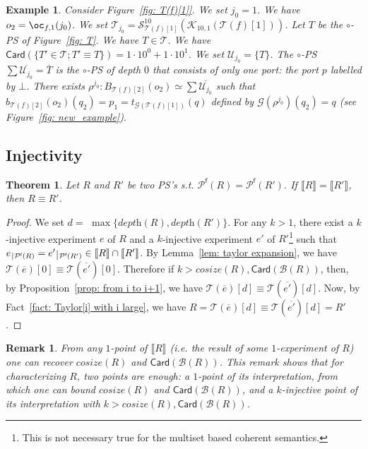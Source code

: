 \documentclass{article}
\newcommand{\target}[1]{t_{#1}}
\theoremstyle{plain}
\newtheorem{theorem}{Theorem}
\newtheorem{example}{Example}
\newtheorem{rem}{Remark}
\newcommand{\nontrivialconnected}[3]{\mathcal{S}_{#1}^{#3}(#2)}
\newcommand{\taylor}[2]{\mathcal{T}(#1)[#2]}
\newcommand{\criticalports}[3]{\mathcal{K}_{#2, #3}(#1)}
\newcommand{\groundof}[1]{\mathcal{G}(#1)}
\newcommand{\cosize}[1]{\textit{cosize}(#1)}
\newcommand{\depthof}[1]{\textit{depth}(#1)}
\def\restriction#1#2{\mathchoice
              {\setbox1\hbox{${\displaystyle #1}_{\scriptstyle #2}$}
              \restrictionaux{#1}{#2}}
              {\setbox1\hbox{${\textstyle #1}_{\scriptstyle #2}$}
              \restrictionaux{#1}{#2}}
              {\setbox1\hbox{${\scriptstyle #1}_{\scriptscriptstyle #2}$}
              \restrictionaux{#1}{#2}}
              {\setbox1\hbox{${\scriptscriptstyle #1}_{\scriptscriptstyle #2}$}
              \restrictionaux{#1}{#2}}}
\def\restrictionaux#1#2{{#1\,\smash{\vrule height .8\ht1 depth .85\dp1}}_{\,#2}}
\newcommand{\cod}{\oc}
\newcommand{\conclusions}[1]{\mathcal{P}^{\textsf{f}}(#1)}
\newcommand{\sm}[1]{\llbracket #1 \rrbracket}
\newcommand{\Card}[1]{\textsf{Card}\left( #1 \right)}
\newcommand{\boxes}[1]{\mathcal{B}(#1)}
\begin{document}
\begin{example}
Consider Figure~\ref{fig: T(f)[1]}. We set $j_0 = 1$. We have $o_2 = \cod_{f, 1}(j_0)$. We set $\mathcal{T}_{j_0} = \nontrivialconnected{\taylor{f}{1}}{\criticalports{\taylor{f}{1}}{10}{1}}{10}$. Let $T$ be the $\circ$-PS of Figure~\ref{fig: T}. We have $T \in \mathcal{T}$. We have $\Card{\{ T' \in \mathcal{T} ; T' \equiv T \}} = 1 \cdot 10^0 + 1 \cdot 10^1$. We set $\mathcal{U}_{j_0} = \{ T \}$. The $\circ$-PS $\sum \overline{\mathcal{U}_{j_0}} = \overline{T}$ is the $\circ$-PS of depth $0$ that consists of only one port: the port $p$ labelled by $\bot$. There exists $\rho^{j_0}: B_{\taylor{f}{2}}(o_2) \simeq \sum \overline{\mathcal{U}_{j_0}}$ such that $b_{\taylor{f}{2}}(o_2)(q_2) = p_1 = \target{\groundof{\taylor{f}{1}}}(q)$ defined by $\groundof{\rho^{j_0}}(q_2) = q$ (see Figure~\ref{fig: new_example}).
\end{example}

\subsection{Injectivity}

\begin{theorem}\label{thm: injectivity}
Let $R$ and $R'$ be two PS's s.t. $\conclusions{R} = \conclusions{R'}$. If $\sm{R} = \sm{R'}$, then $R \equiv R'$.
\end{theorem}

\begin{proof}
We set $d = $ $\max{\{ \depthof{R}, \depthof{R'} \}}$. 
For any $k > 1$, there exist a $k$-injective experiment $e$ of $R$ and a $k$-injective experiment $e'$ of $R'$\footnote{This is not necessary true for the multiset based coherent semantics.} such that $\restriction{e}{\conclusions{R}} = \restriction{e'}{\conclusions{R'}} \in \sm{R} \cap \sm{R'}$. By Lemma~\ref{lem: taylor expansion}, we have $\taylor{\overline{e}}{0} \equiv \taylor{\overline{e'}}{0}$. Therefore if $k > \cosize{R}, \Card{\boxes{R}}$, then, by Proposition~\ref{prop: from i to i+1}, we have $\taylor{\overline{e}}{d} \equiv \taylor{\overline{e'}}{d}$. Now, by Fact~\ref{fact: Taylor[i] with i large}, we have $R = \taylor{\overline{e}}{d} \equiv \taylor{\overline{e'}}{d} = R'$.
\end{proof}

\begin{rem}
From any $1$-point of $\sm{R}$ (i.e. the result of some $1$-experiment of $R$) one can recover $\cosize{R}$ and $\Card{\boxes{R}}$. This remark shows that for characterizing $R$, two points are enough: a $1$-point of its interpretation, from which one can bound $\cosize{R}$ and $\Card{\boxes{R}}$, and a $k$-injective point of its interpretation with $k > \cosize{R},  \Card {\boxes{R}}$.
\end{rem}
\end{document}

